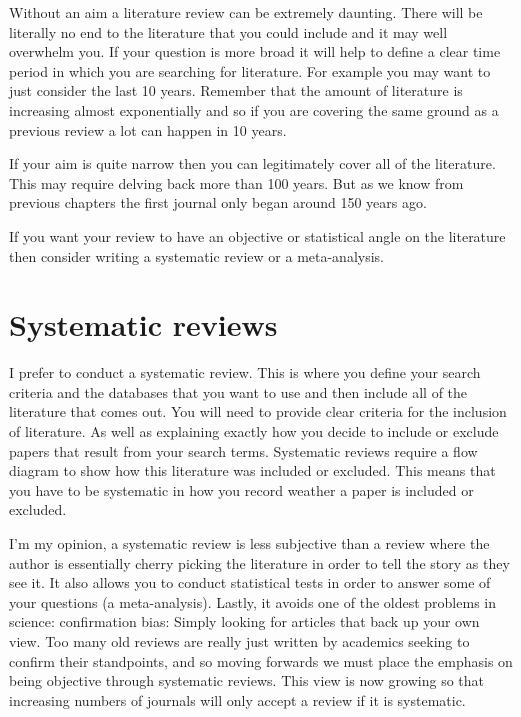 \documentclass[
]{krantz}
\begin{document}
Without an aim a literature review can be extremely daunting. There will be literally no end to the literature that you could include and it may well overwhelm you. If your question is more broad it will help to define a clear time period in which you are searching for literature. For example you may want to just consider the last 10 years. Remember that the amount of literature is increasing almost exponentially and so if you are covering the same ground as a previous review a lot can happen in 10 years.

If your aim is quite narrow then you can legitimately cover all of the literature. This may require delving back more than 100 years. But as we know from previous chapters the first journal only began around 150 years ago.

If you want your review to have an objective or statistical angle on the literature then consider writing a systematic review or a meta-analysis.

\hypertarget{systematic-reviews}{%
\section{Systematic reviews}\label{systematic-reviews}}

I prefer to conduct a systematic review. This is where you define your search criteria and the databases that you want to use and then include all of the literature that comes out. You will need to provide clear criteria for the inclusion of literature. As well as explaining exactly how you decide to include or exclude papers that result from your search terms. Systematic reviews require a flow diagram to show how this literature was included or excluded. This means that you have to be systematic in how you record weather a paper is included or excluded.

I'm my opinion, a systematic review is less subjective than a review where the author is essentially cherry picking the literature in order to tell the story as they see it. It also allows you to conduct statistical tests in order to answer some of your questions (a meta-analysis). Lastly, it avoids one of the oldest problems in science: confirmation bias: Simply looking for articles that back up your own view. Too many old reviews are really just written by academics seeking to confirm their standpoints, and so moving forwards we must place the emphasis on being objective through systematic reviews. This view is now growing so that increasing numbers of journals will only accept a review if it is systematic.
\end{document}
